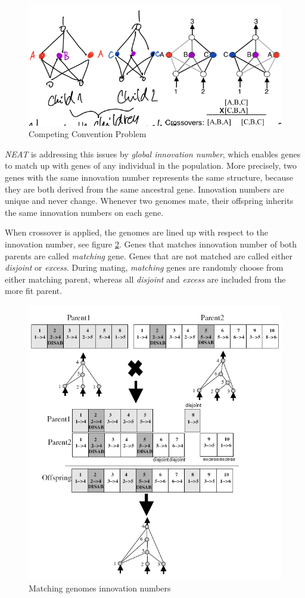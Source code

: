 \documentclass[format=acmsmall, review=false, screen=true]{acmart}
\begin{document}
\begin{figure}[H]
  \includegraphics[width=0.56\linewidth]{img/competing_convention.JPEG}
  \caption{\label{fig:competing_convention}Competing Convention Problem}
\end{figure}

\emph{NEAT} is addressing this issues by \emph{global innovation number}, which enables genes to match up with genes of any individual in the population. More precisely, two genes with the same innovation number represents the same structure, because they are both derived from the same ancestral gene. Innovation numbers are unique and never change. Whenever two genomes mate, their offspring inherits the same innovation numbers on each gene.

When crossover is applied, the genomes are lined up with respect to the innovation number, see figure \ref{fig:crossover}. Genes that matches innovation number of both parents are called \emph{matching} gene. Genes that are not matched are called either \emph{disjoint} or \emph{excess}. During mating, \emph{matching} genes are randomly choose from either matching parent, whereas all \emph{disjoint} and \emph{excess} are included from the more fit parent.

\begin{figure}[H]
  \includegraphics[width=0.5\linewidth]{img/crossover.PNG}
  \caption{\label{fig:crossover}Matching genomes innovation numbers}
\end{figure}
\end{document}
